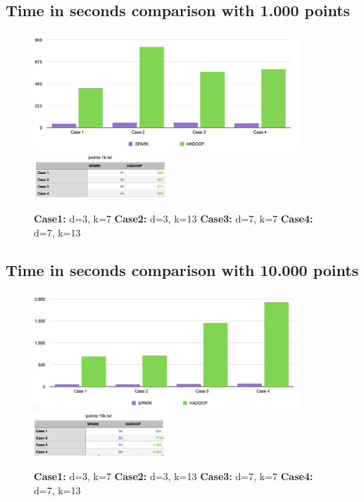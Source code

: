 \documentclass{book}
\begin{document}
    \paragraph{}

    \subsection{Time in seconds comparison with 1.000 points}
    \paragraph{}

    \begin{figure}[H]
        \includegraphics[width=10cm]{hadoop+spark/grafico_points1k}
        \includegraphics[width=5cm]{hadoop+spark/tabella_point1k}
        \centering
        \caption{\footnotesize{\textbf{Case1:} d=3, k=7 \textbf{Case2:} d=3, k=13 \textbf{Case3:} d=7, k=7 \textbf{Case4:} d=7, k=13}}
    \end{figure}


    \subsection{Time in seconds comparison with 10.000 points}
    \paragraph{}

    \begin{figure}[H]
        \includegraphics[width=10cm]{hadoop+spark/grafico_points10k}
        \includegraphics[width=5cm]{hadoop+spark/tabella_point10k}
        \centering
        \caption{\footnotesize{\textbf{Case1:} d=3, k=7 \textbf{Case2:} d=3, k=13 \textbf{Case3:} d=7, k=7 \textbf{Case4:} d=7, k=13}}
    \end{figure}
\end{document}
